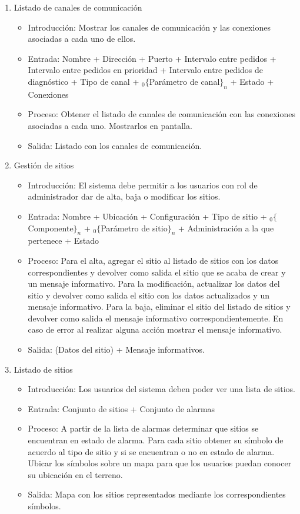 \begin{enumerate}
			\item Listado de canales de comunicación
				\begin{itemize}
					\item Introducción: Mostrar los canales de comunicación y las conexiones asociadas a cada uno de ellos.
					\item Entrada: Nombre + Dirección + Puerto + Intervalo entre pedidos + Intervalo entre pedidos en prioridad + Intervalo entre pedidos de diagnóstico + Tipo de canal + ${}_{0}\{$Parámetro de canal$\}_n$ + Estado + Conexiones
					\item Proceso: Obtener el listado de canales de comunicación con las conexiones asociadas a cada uno. Mostrarlos en pantalla.
					\item Salida:	Listado con los canales de comunicación.
				\end{itemize}
				
			\item Gestión de sitios
				\begin{itemize}
					\item Introducción: El sistema debe permitir a los usuarios con rol de administrador dar de alta, baja o modificar los sitios.
					\item Entrada: Nombre + Ubicación + Configuración + Tipo de sitio + ${}_{0}\{$Componente$\}_n$ + ${}_{0}\{$Parámetro de sitio$\}_n$ + Administración a la que pertenece + Estado
					\item Proceso: Para el alta, agregar el sitio al listado de sitios con los datos correspondientes y devolver como salida el sitio que se acaba de crear y un mensaje informativo. Para la modificación, actualizar los datos del sitio y devolver como salida el sitio con los datos actualizados y un mensaje informativo. Para la baja, eliminar el sitio del listado de sitios y devolver como salida el mensaje informativo correspondientemente. En caso de error al realizar alguna acción mostrar el mensaje informativo.
					\item Salida: (Datos del sitio) + Mensaje informativos.
				\end{itemize}
				
			\item Listado de sitios
				\begin{itemize}
					\item Introducción: Los usuarios del sistema deben poder ver una lista de sitios.
					\item Entrada: Conjunto de sitios + Conjunto de alarmas
					\item Proceso: A partir de la lista de alarmas determinar que sitios se encuentran en estado de alarma. Para cada sitio obtener su símbolo de acuerdo al tipo de sitio y si se encuentran o no en estado de alarma. Ubicar los símbolos sobre un mapa para que los usuarios puedan conocer su ubicación en el terreno.
					\item Salida: Mapa con los sitios representados mediante los correspondientes símbolos.
				\end{itemize}
				

\end{enumerate}
